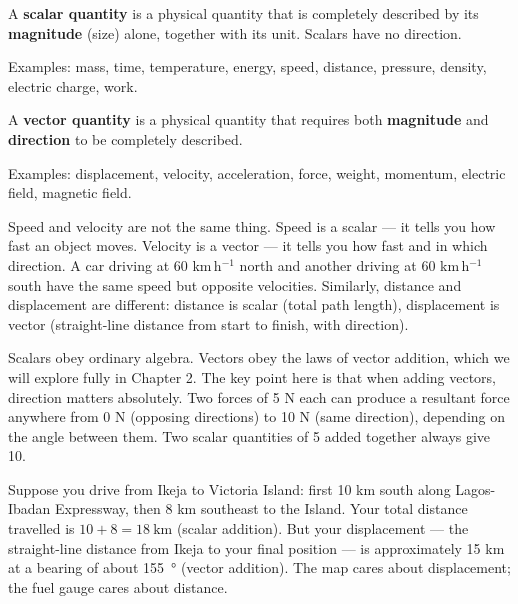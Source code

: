 \begin{definitionbox}
A \textbf{scalar quantity} is a physical quantity that is
completely described by its \textbf{magnitude} (size) alone,
together with its unit. Scalars have no direction.

Examples: mass, time, temperature, energy, speed, distance,
pressure, density, electric charge, work.
\end{definitionbox}

\begin{definitionbox}
A \textbf{vector quantity} is a physical quantity that
requires both \textbf{magnitude} and \textbf{direction} to
be completely described.

Examples: displacement, velocity, acceleration, force,
weight, momentum, electric field, magnetic field.
\end{definitionbox}

\begin{misconceptionbox}
Speed and velocity are not the same thing. Speed is a scalar
--- it tells you how fast an object moves. Velocity is a
vector --- it tells you how fast and in which direction.
A car driving at 60 km\,h$^{-1}$ north and another driving
at 60 km\,h$^{-1}$ south have the same speed but opposite
velocities. Similarly, distance and displacement are
different: distance is scalar (total path length),
displacement is vector (straight-line distance from start
to finish, with direction).
\end{misconceptionbox}

Scalars obey ordinary algebra. Vectors obey the laws of
vector addition, which we will explore fully in Chapter 2.
The key point here is that when adding vectors, direction
matters absolutely. Two forces of 5 N each can produce a
resultant force anywhere from 0 N (opposing directions)
to 10 N (same direction), depending on the angle between
them. Two scalar quantities of 5 added together always
give 10.

\begin{realworldbox}
Suppose you drive from Ikeja to Victoria Island: first
10 km south along Lagos-Ibadan Expressway, then 8 km
southeast to the Island. Your total distance travelled
is $10 + 8 = 18\ \text{km}$ (scalar addition). But your
displacement --- the straight-line distance from Ikeja
to your final position --- is approximately 15 km at a
bearing of about \SI{155}{\degree} (vector addition). The map cares
about displacement; the fuel gauge cares about distance.
\end{realworldbox}

